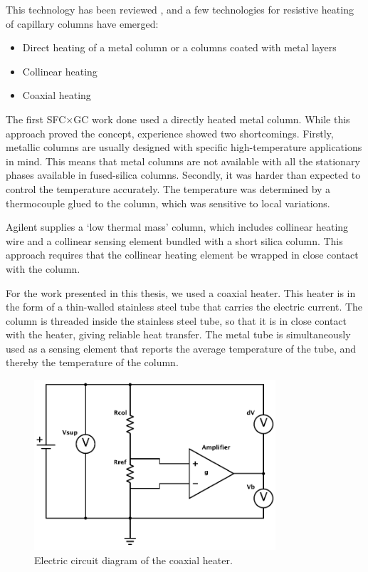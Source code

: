 This technology has been reviewed \autocite{Wang2012,Jacobs2013}, and a few
technologies for resistive heating of capillary columns have emerged:

\begin{itemize}
  \item Direct heating of a metal column or a columns coated with metal layers
  \item Collinear heating
  \item Coaxial heating
\end{itemize}

The first SFC×GC work done \autocite{Venter2004} used a directly heated metal
column. While this approach proved the concept, experience showed two
shortcomings. Firstly, metallic columns are usually designed with specific
high-temperature applications in mind. This means that metal columns are not
available with all the stationary phases available in fused-silica columns.
Secondly, it was harder than expected to control the temperature accurately. The
temperature was determined by a thermocouple glued to the column, which was
sensitive to local variations.

Agilent\texttrademark{} supplies a `low thermal mass' column, which includes
collinear heating wire and a collinear sensing element bundled with a short
silica column. This approach requires that the collinear heating element be
wrapped in close contact with the column.

For the work presented in this thesis, we used a coaxial heater. This heater is
in the form of a thin-walled stainless steel tube that carries the electric
current. The column is threaded inside the stainless steel tube, so that it is
in close contact with the heater, giving reliable heat transfer. The metal tube
is simultaneously used as a sensing element that reports the average temperature
of the tube, and thereby the temperature of the column.

\begin{figure}[htbp]
	\centering
	\includegraphics[width=0.8\textwidth]{Figures/Column-Heater.pdf}
	\decoRule
	\caption[Coaxial heater resistance heater]{\label{fig:HeaterDiagram}Electric circuit diagram of the coaxial heater.}
\end{figure}

